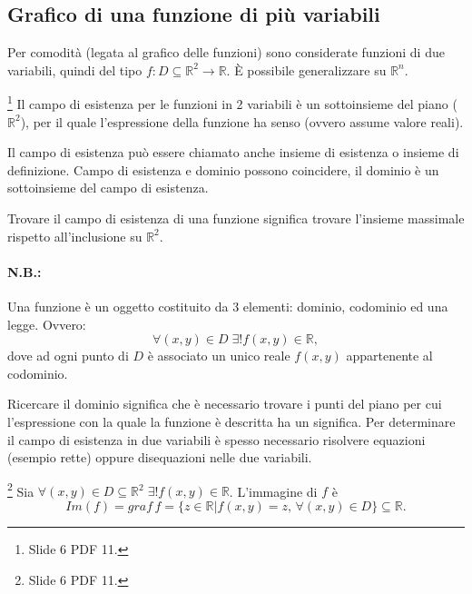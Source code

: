 \subsection{Grafico di una funzione di più variabili}\label{ssec:grafico_funzione_n_variabili}
Per comodità (legata al grafico delle funzioni) sono considerate funzioni di due variabili, quindi del tipo $f\colon D\subseteq\mathbb R^2\rightarrow\mathbb R$. È possibile generalizzare su $\mathbb R^n$.

\begin{definition}\footnote{Slide 6 PDF 11.}
    Il campo di esistenza per le funzioni in 2 variabili è un sottoinsieme del piano ($\mathbb R^2$), per il quale l'espressione della funzione ha senso (ovvero assume valore reali).
\end{definition}

Il campo di esistenza può essere chiamato anche insieme di esistenza o insieme di definizione. Campo di esistenza e dominio possono coincidere, il dominio è un sottoinsieme del campo di esistenza.

\begin{remark}
    Trovare il campo di esistenza di una funzione significa trovare l'insieme massimale rispetto all'inclusione su $\mathbb R^2$.
\end{remark}

\paragraph{N.B.:} Una funzione è un oggetto costituito da 3 elementi: dominio, codominio ed una legge. Ovvero:
\begin{equation*}
    \forall(x,y)\in D\;\exists!f(x,y)\in\mathbb R,
\end{equation*}
dove ad ogni punto di $D$ è associato un unico reale $f(x,y)$ appartenente al codominio.

Ricercare il dominio significa che è necessario trovare i punti del piano per cui l'espressione con la quale la funzione è descritta ha un significa. Per determinare il campo di esistenza in due variabili è spesso necessario risolvere equazioni (esempio rette) oppure disequazioni nelle due variabili.

\begin{definition}[Immagine di $f$]\footnote{Slide 6 PDF 11.}
    Sia $\forall(x,y)\in D\subseteq\mathbb R^2\;\exists!f(x,y)\in\mathbb R$. L'immagine di $f$ è
    \begin{equation*}
        Im(f)=graf\, f=\{z\in\mathbb R| f(x,y)=z,\,\forall(x,y)\in D\}\subseteq\mathbb R.
    \end{equation*}
\end{definition}

